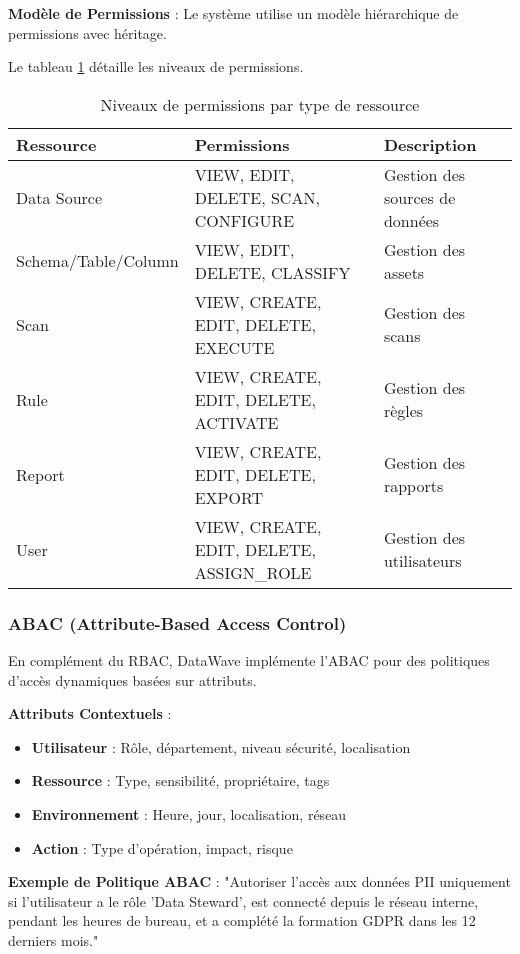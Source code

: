 \textbf{Modèle de Permissions} : Le système utilise un modèle hiérarchique de permissions avec héritage.

Le tableau \ref{tab:niveaux_permissions} détaille les niveaux de permissions.

\begin{table}[htpb]
\centering
\caption{Niveaux de permissions par type de ressource}
\label{tab:niveaux_permissions}
\begin{tabular}{|p{}|p{}|p{}|}
\hline
\textbf{Ressource} & \textbf{Permissions} & \textbf{Description} \\
\hline
Data Source & VIEW, EDIT, DELETE, SCAN, CONFIGURE & Gestion des sources de données \\
\hline
Schema/Table/Column & VIEW, EDIT, DELETE, CLASSIFY & Gestion des assets \\
\hline
Scan & VIEW, CREATE, EDIT, DELETE, EXECUTE & Gestion des scans \\
\hline
Rule & VIEW, CREATE, EDIT, DELETE, ACTIVATE & Gestion des règles \\
\hline
Report & VIEW, CREATE, EDIT, DELETE, EXPORT & Gestion des rapports \\
\hline
User & VIEW, CREATE, EDIT, DELETE, ASSIGN\_ROLE & Gestion des utilisateurs \\
\hline
\end{tabular}
\end{table}

\subsubsection{ABAC (Attribute-Based Access Control)}

En complément du RBAC, DataWave implémente l'ABAC pour des politiques d'accès dynamiques basées sur attributs.

\textbf{Attributs Contextuels} :
\begin{itemize}
    \item \textbf{Utilisateur} : Rôle, département, niveau sécurité, localisation
    \item \textbf{Ressource} : Type, sensibilité, propriétaire, tags
    \item \textbf{Environnement} : Heure, jour, localisation, réseau
    \item \textbf{Action} : Type d'opération, impact, risque
\end{itemize}

\textbf{Exemple de Politique ABAC} : "Autoriser l'accès aux données PII uniquement si l'utilisateur a le rôle 'Data Steward', est connecté depuis le réseau interne, pendant les heures de bureau, et a complété la formation GDPR dans les 12 derniers mois."

